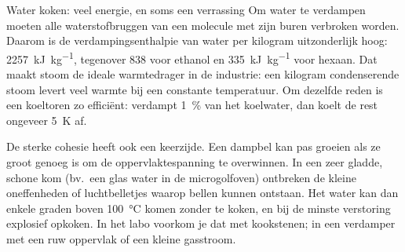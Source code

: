 \begin{toepassing}{Water koken: veel energie, en soms een verrassing}
Om water te verdampen moeten alle waterstofbruggen van een molecule met zijn buren verbroken worden. Daarom is de verdampingsenthalpie van water per kilogram uitzonderlijk hoog: \SI{2257}{\kilo\joule\per\kilo\gram}, tegenover \SI{838}{} voor ethanol en \SI{335}{\kilo\joule\per\kilo\gram} voor hexaan. Dat maakt stoom de ideale warmtedrager in de industrie: een kilogram condenserende stoom levert veel warmte bij een constante temperatuur. Om dezelfde reden is een koeltoren zo effici\"ent: verdampt \SI{1}{\percent} van het koelwater, dan koelt de rest ongeveer \SI{5}{\kelvin} af.

De sterke cohesie heeft ook een keerzijde. Een dampbel kan pas groeien als ze groot genoeg is om de oppervlaktespanning te overwinnen. In een zeer gladde, schone kom (bv.\ een glas water in de microgolfoven) ontbreken de kleine oneffenheden of luchtbelletjes waarop bellen kunnen ontstaan. Het water kan dan enkele graden boven \SI{100}{\celsius} komen zonder te koken, en bij de minste verstoring explosief opkoken. In het labo voorkom je dat met kookstenen; in een verdamper met een ruw oppervlak of een kleine gasstroom.
\end{toepassing}

